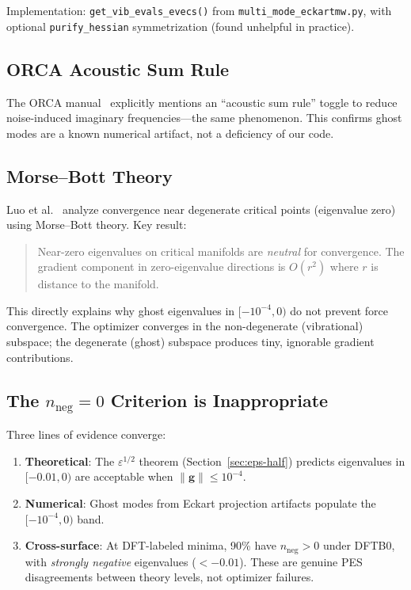\documentclass[11pt,a4paper]{article}
\newcommand{\vect}[1]{\bm{#1}}
\newcommand{\norm}[1]{\lVert #1 \rVert}
\theoremstyle{definition}
\begin{document}
Implementation: \texttt{get\_vib\_evals\_evecs()} from
\texttt{multi\_mode\_eckartmw.py}, with optional \texttt{purify\_hessian}
symmetrization (found unhelpful in practice).

\subsection{ORCA Acoustic Sum Rule}

The ORCA manual~\citep{orca-manual} explicitly mentions an ``acoustic sum rule''
toggle to reduce noise-induced imaginary frequencies---the same phenomenon.
This confirms ghost modes are a known numerical artifact, not a deficiency of
our code.

\subsection{Morse--Bott Theory}
\label{sec:morse-bott}

Luo et al.~\citep{convergence-degenerate} analyze convergence near degenerate
critical points (eigenvalue zero) using Morse--Bott theory.  Key result:
\begin{quote}
  Near-zero eigenvalues on critical manifolds are \emph{neutral} for
  convergence.  The gradient component in zero-eigenvalue directions is
  $O(r^2)$ where $r$ is distance to the manifold.
\end{quote}
This directly explains why ghost eigenvalues in $[-10^{-4}, 0)$ do not
prevent force convergence.  The optimizer converges in the non-degenerate
(vibrational) subspace; the degenerate (ghost) subspace produces tiny,
ignorable gradient contributions.

\subsection{The $n_\text{neg}=0$ Criterion is Inappropriate}
\label{sec:nneg-inappropriate}

Three lines of evidence converge:
\begin{enumerate}[nosep]
  \item \textbf{Theoretical}: The $\varepsilon^{1/2}$ theorem
    (Section~\ref{sec:eps-half}) predicts eigenvalues in $[-0.01, 0)$ are
    acceptable when $\norm{\vect{g}} \leq 10^{-4}$.
  \item \textbf{Numerical}: Ghost modes from Eckart projection artifacts
    populate the $[-10^{-4}, 0)$ band.
  \item \textbf{Cross-surface}: At DFT-labeled minima, 90\% have $n_\text{neg}>0$
    under DFTB0, with \emph{strongly negative} eigenvalues ($<-0.01$).  These
    are genuine PES disagreements between theory levels, not optimizer failures.
\end{enumerate}
\end{document}
